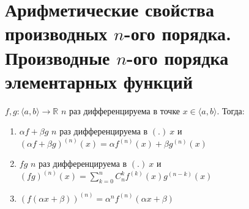 \section{Арифметические свойства производных $n$-ого порядка. Производные $n$-ого порядка элементарных функций}

\begin{theorem-non}
    $f, g: \langle a,b \rangle \rightarrow \mathbb{R}$ $n$ раз дифференцируема в точке $x \in \langle a,b \rangle$. Тогда:

    \begin{enumerate}
        \item $\alpha f + \beta g$ $n$ раз дифференцируема в $(.) \ x$ и $(\alpha f + \beta g)^{(n)} (x) = \alpha f^{(n)}(x) + \beta g^{(n)}(x)$ 
        \item $fg$ $n$ раз дифференцируема в $(.) \ x$ и $(fg)^{(n)}(x) = \sum\limits_{k=0}^{n} C_n^k f^{(k)}(x) g^{(n-k)} (x)$
        \item $(f(\alpha x + \beta))^{(n)} = \alpha^n f^{(n)}(\alpha x + \beta)$
    \end{enumerate}
\end{theorem-non}
